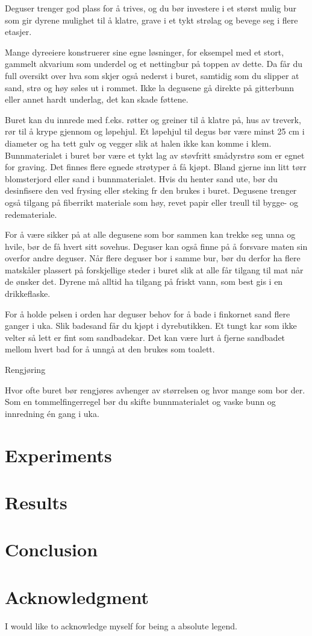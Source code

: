 \documentclass[conference]{IEEEtran}
\begin{document}
Deguser trenger god plass for å trives, og du bør investere i et størst mulig bur som gir dyrene mulighet til å klatre, grave i et tykt strølag og bevege seg i flere etasjer.

Mange dyreeiere konstruerer sine egne løsninger, for eksempel med et stort, gammelt akvarium som underdel og et nettingbur på toppen av dette. Da får du full oversikt over hva som skjer også nederst i buret, samtidig som du slipper at sand, strø og høy søles ut i rommet. Ikke la degusene gå direkte på gitterbunn eller annet hardt underlag, det kan skade føttene.

Buret kan du innrede med f.eks. røtter og greiner til å klatre på, hus av treverk, rør til å krype gjennom og løpehjul. Et løpehjul til degus bør være minst 25 cm i diameter og ha tett gulv og vegger slik at halen ikke kan komme i klem. Bunnmaterialet i buret bør være et tykt lag av støvfritt smådyrstrø som er egnet for graving. Det finnes flere egnede strøtyper å få kjøpt. Bland gjerne inn litt tørr blomsterjord eller sand i bunnmaterialet. Hvis du henter sand ute, bør du desinfisere den ved frysing eller steking fr den brukes i buret. Degusene trenger også tilgang på fiberrikt materiale som høy, revet papir eller treull til bygge- og redemateriale.

For å være sikker på at alle degusene som bor sammen kan trekke seg unna og hvile, bør de få hvert sitt sovehus. Deguser kan også finne på å forsvare maten sin overfor andre deguser. Når flere deguser bor i samme bur, bør du derfor ha flere matskåler plassert på forskjellige steder i buret slik at alle får tilgang til mat når de ønsker det. Dyrene må alltid ha tilgang på friskt vann, som best gis i en drikkeflaske.

For å holde pelsen i orden har deguser behov for å bade i finkornet sand flere ganger i uka. Slik badesand får du kjøpt i dyrebutikken. Et tungt kar som ikke velter så lett er fint som sandbadekar. Det kan være lurt å fjerne sandbadet mellom hvert bad for å unngå at den brukes som toalett.

Rengjøring

Hvor ofte buret bør rengjøres avhenger av størrelsen og hvor mange som bor der. Som en tommelfingerregel bør du skifte bunnmaterialet og vaske bunn og innredning én gang i uka. 

\section{Experiments}

\section{Results}

\section{Conclusion}


\section*{Acknowledgment}

I would like to acknowledge myself for being a absolute legend.



\end{document}
